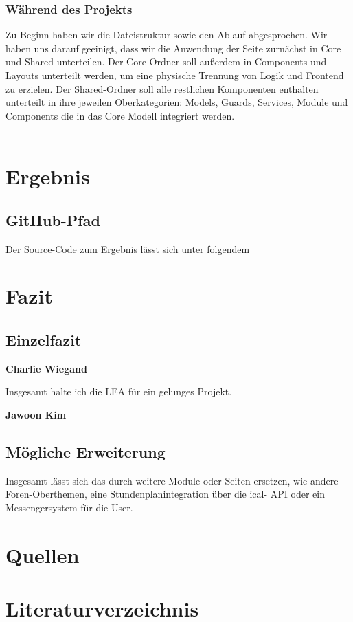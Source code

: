 \documentclass[12pt,titlepage]{article}
\begin{document}
\subsubsection{Während des Projekts}

Zu Beginn haben wir die Dateistruktur sowie den Ablauf abgesprochen. Wir haben uns darauf geeinigt, dass wir die Anwendung der Seite zurnächst in Core und Shared unterteilen. Der Core-Ordner soll außerdem in Components und Layouts unterteilt werden, um eine physische Trennung von Logik und Frontend zu erzielen. Der Shared-Ordner soll alle restlichen Komponenten enthalten unterteilt in ihre jeweilen Oberkategorien: Models, Guards, Services, Module und Components die in das Core Modell integriert werden. \\ \\


\section{Ergebnis}

\subsection{GitHub-Pfad}

Der Source-Code zum Ergebnis lässt sich unter folgendem


\section{Fazit}

\subsection{Einzelfazit}
\textbf{Charlie Wiegand}

Insgesamt halte ich die LEA für ein gelunges Projekt.


\textbf{Jawoon Kim}

\subsection{Mögliche Erweiterung}

Insgesamt lässt sich das durch weitere Module oder Seiten ersetzen, wie andere Foren-Oberthemen, eine Stundenplanintegration über die ical- API oder 
ein Messengersystem für die User.

\section{Quellen}

\section{Literaturverzeichnis}
\end{document}
